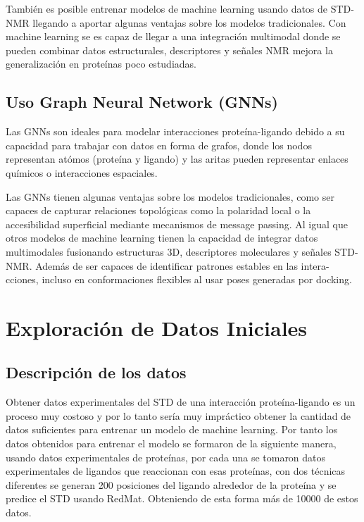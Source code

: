 \documentclass{article}
\begin{document}
También es posible entrenar modelos de machine learning usando datos de STD-NMR llegando a aportar algunas ventajas sobre los modelos tradicionales. Con machine learning
se es capaz de llegar a una integración multimodal donde se pueden combinar datos estructurales, descriptores y señales NMR mejora la generalización en proteínas poco estudiadas\cite{multimodal}.

\newpage

\subsection{Uso Graph Neural Network (GNNs)}
Las GNNs son ideales para modelar interacciones proteína-ligando debido a su capacidad para trabajar con datos en forma de grafos, donde los nodos representan atómos (proteína y ligando)
y las aritas pueden representar enlaces químicos o interacciones espaciales.

Las GNNs tienen algunas ventajas sobre los modelos tradicionales, como ser capaces de capturar relaciones topológicas como la polaridad local o la accesibilidad superficial mediante mecanismos
de message passing\cite{gnn}. Al igual que otros modelos de machine learning tienen la capacidad de integrar datos multimodales fusionando estructuras 3D, descriptores moleculares y señales STD-NMR\cite{nmr}. Además
de ser capaces de identificar patrones estables en las intera-cciones, incluso en conformaciones flexibles al usar poses generadas por docking.

\newpage

\section{Exploración de Datos Iniciales}

\subsection{Descripción de los datos}
Obtener datos experimentales del STD de una interacción proteína-ligando es un proceso muy costoso y por lo tanto sería muy impráctico obtener la cantidad de datos suficientes para entrenar un modelo
de machine learning. Por tanto los datos obtenidos para entrenar el modelo se formaron de la siguiente manera, usando datos experimentales de proteínas, por cada una se tomaron datos experimentales de
ligandos que reaccionan con esas proteínas, con dos técnicas diferentes se generan 200 posiciones del ligando alrededor de la proteína y se predice el STD usando RedMat. Obteniendo de esta forma más
de 10000 de estos datos.
\end{document}
